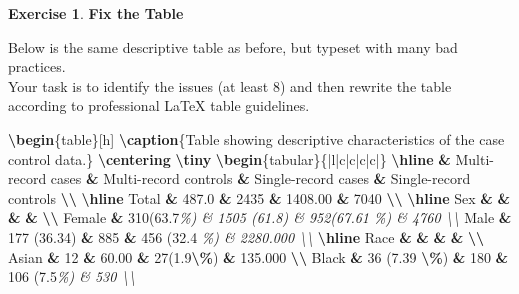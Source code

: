 \documentclass[
]{book}
\newenvironment{Shaded}{\begin{snugshade}}{\end{snugshade}}
\newcommand{\CommentTok}[1]{\textcolor[rgb]{0.56,0.35,0.01}{\textit{#1}}}
\newcommand{\ExtensionTok}[1]{#1}
\newcommand{\FunctionTok}[1]{\textcolor[rgb]{0.13,0.29,0.53}{\textbf{#1}}}
\newcommand{\KeywordTok}[1]{\textcolor[rgb]{0.13,0.29,0.53}{\textbf{#1}}}
\newcommand{\NormalTok}[1]{#1}
\newcommand{\OperatorTok}[1]{\textcolor[rgb]{0.81,0.36,0.00}{\textbf{#1}}}
\theoremstyle{definition}
\theoremstyle{definition}
\theoremstyle{definition}
\newtheorem{exercise}{Exercise}[chapter]
\theoremstyle{definition}
\theoremstyle{remark}
\begin{document}
\begin{exercise}

\textbf{Fix the Table}

Below is the same descriptive table as before, but typeset
with many bad practices.\\
Your task is to identify the issues (at least 8) and then rewrite
the table according to professional LaTeX table guidelines.

\begin{Shaded}
\begin{Highlighting}[]
\KeywordTok{\textbackslash{}begin}\NormalTok{\{}\ExtensionTok{table}\NormalTok{\}[h]}
\FunctionTok{\textbackslash{}caption}\NormalTok{\{Table showing descriptive characteristics of the case control data.\}}
\FunctionTok{\textbackslash{}centering}
\FunctionTok{\textbackslash{}tiny}
\KeywordTok{\textbackslash{}begin}\NormalTok{\{}\ExtensionTok{tabular}\NormalTok{\}\{|l|c|c|c|c|\}}
\FunctionTok{\textbackslash{}hline}
 \OperatorTok{\&}\NormalTok{ Multi{-}record cases }\OperatorTok{\&}\NormalTok{ Multi{-}record controls }\OperatorTok{\&}\NormalTok{ Single{-}record cases }\OperatorTok{\&} 
\NormalTok{ Single{-}record controls }\FunctionTok{\textbackslash{}\textbackslash{}}
\FunctionTok{\textbackslash{}hline}
\NormalTok{Total }\OperatorTok{\&}\NormalTok{ 487.0 }\OperatorTok{\&}\NormalTok{ 2435 }\OperatorTok{\&}\NormalTok{ 1408.00 }\OperatorTok{\&}\NormalTok{ 7040 }\FunctionTok{\textbackslash{}\textbackslash{}}
\FunctionTok{\textbackslash{}hline}
\NormalTok{Sex }\OperatorTok{\&}   \OperatorTok{\&}   \OperatorTok{\&}   \OperatorTok{\&}   \FunctionTok{\textbackslash{}\textbackslash{}}
\NormalTok{Female }\OperatorTok{\&}\NormalTok{ 310(63.7}\CommentTok{\%) \& 1505 (61.8) \& 952(67.61 \%) \& 4760 \textbackslash{}\textbackslash{}}
\NormalTok{Male }\OperatorTok{\&}\NormalTok{ 177 (36.34) }\OperatorTok{\&}\NormalTok{ 885 }\OperatorTok{\&}\NormalTok{ 456 (32.4 }\CommentTok{\%) \& 2280.000 \textbackslash{}\textbackslash{}}
\FunctionTok{\textbackslash{}hline}
\NormalTok{Race }\OperatorTok{\&}   \OperatorTok{\&}   \OperatorTok{\&}   \OperatorTok{\&}   \FunctionTok{\textbackslash{}\textbackslash{}}
\NormalTok{Asian }\OperatorTok{\&}\NormalTok{ 12 }\OperatorTok{\&}\NormalTok{ 60.00 }\OperatorTok{\&}\NormalTok{ 27(1.9}\FunctionTok{\textbackslash{}\%}\NormalTok{) }\OperatorTok{\&}\NormalTok{ 135.000 }\FunctionTok{\textbackslash{}\textbackslash{}}
\NormalTok{Black }\OperatorTok{\&}\NormalTok{ 36 (7.39 }\FunctionTok{\textbackslash{}\%}\NormalTok{) }\OperatorTok{\&}\NormalTok{ 180 }\OperatorTok{\&}\NormalTok{ 106 (7.5}\CommentTok{\%) \& 530 \textbackslash{}\textbackslash{}}

\end{Highlighting}
\end{Shaded}
\end{exercise}
\end{document}

